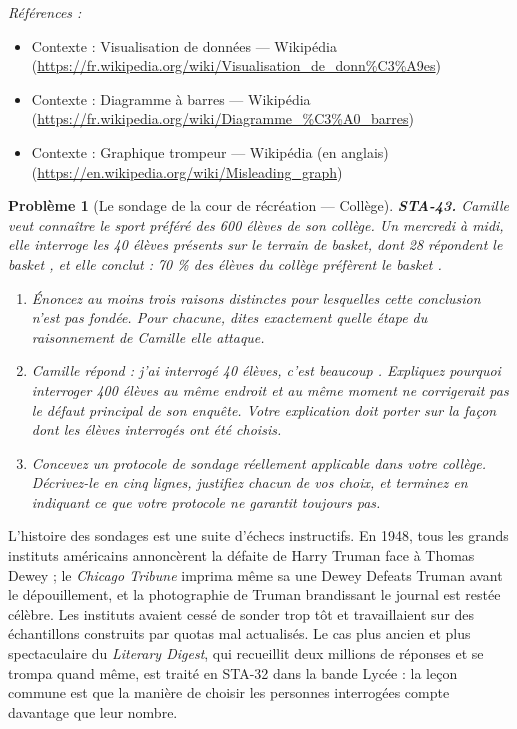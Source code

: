\documentclass[11pt]{article}
\newtheorem{problem}{Problème}
\newenvironment{refs}{\par\small\noindent\emph{Références :}\begin{itemize}\setlength\itemsep{0pt}}{\end{itemize}\normalsize}
\begin{document}
\begin{refs}
\item Contexte : Visualisation de données --- Wikipédia (\url{https://fr.wikipedia.org/wiki/Visualisation_de_donn%C3%A9es})
\item Contexte : Diagramme à barres --- Wikipédia (\url{https://fr.wikipedia.org/wiki/Diagramme_%C3%A0_barres})
\item Contexte : Graphique trompeur --- Wikipédia (en anglais) (\url{https://en.wikipedia.org/wiki/Misleading_graph})
\end{refs}

\bigskip

\begin{problem}[{Le sondage de la cour de récréation --- Collège}]
\textbf{STA-43.} Camille veut connaître le sport préféré des 600 élèves de son collège. Un
mercredi à midi, elle interroge les 40 élèves présents sur le terrain de basket, dont 28 répondent
\og{} le basket \fg{}, et elle conclut : \og{} 70 \% des élèves du collège préfèrent le basket \fg{}.
\begin{enumerate}
\item[(a)] Énoncez au moins trois raisons distinctes pour lesquelles cette conclusion n'est pas fondée.
Pour chacune, dites exactement quelle étape du raisonnement de Camille elle attaque.
\item[(b)] Camille répond : \og{} j'ai interrogé 40 élèves, c'est beaucoup \fg{}. Expliquez pourquoi interroger
400 élèves au même endroit et au même moment ne corrigerait pas le défaut principal de son
enquête. Votre explication doit porter sur la façon dont les élèves interrogés ont été choisis.
\item[(c)] Concevez un protocole de sondage réellement applicable dans votre collège. Décrivez-le en cinq
lignes, justifiez chacun de vos choix, et terminez en indiquant ce que votre protocole ne garantit
toujours pas.
\end{enumerate}

\end{problem}

\noindent L'histoire des sondages est une suite d'échecs instructifs. En 1948, tous les
grands instituts américains annoncèrent la défaite de Harry Truman face à Thomas Dewey ; le
\textit{Chicago Tribune} imprima même sa une \og{} Dewey Defeats Truman \fg{} avant le dépouillement, et la
photographie de Truman brandissant le journal est restée célèbre. Les instituts avaient cessé de
sonder trop tôt et travaillaient sur des échantillons construits par quotas mal actualisés. Le cas
plus ancien et plus spectaculaire du \textit{Literary Digest}, qui recueillit deux millions de
réponses et se trompa quand même, est traité en STA-32 dans la bande Lycée : la leçon commune est
que la manière de choisir les personnes interrogées compte davantage que leur nombre.
\end{document}
